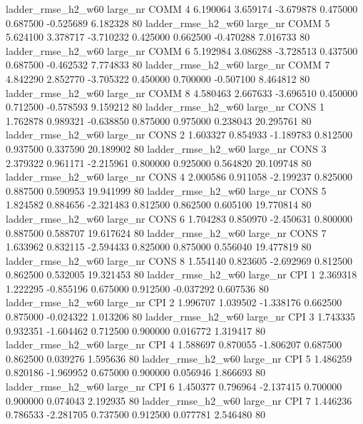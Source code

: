  ladder_rmse_h2_w60   large_nr     COMM                 4  6.190064  3.659174  -3.679878 0.475000 0.687500 -0.525689    6.182328 80
 ladder_rmse_h2_w60   large_nr     COMM                 5  5.624100  3.378717  -3.710232 0.425000 0.662500 -0.470288    7.016733 80
 ladder_rmse_h2_w60   large_nr     COMM                 6  5.192984  3.086288  -3.728513 0.437500 0.687500 -0.462532    7.774833 80
 ladder_rmse_h2_w60   large_nr     COMM                 7  4.842290  2.852770  -3.705322 0.450000 0.700000 -0.507100    8.464812 80
 ladder_rmse_h2_w60   large_nr     COMM                 8  4.580463  2.667633  -3.696510 0.450000 0.712500 -0.578593    9.159212 80
 ladder_rmse_h2_w60   large_nr     CONS                 1  1.762878  0.989321  -0.638850 0.875000 0.975000  0.238043   20.295761 80
 ladder_rmse_h2_w60   large_nr     CONS                 2  1.603327  0.854933  -1.189783 0.812500 0.937500  0.337590   20.189902 80
 ladder_rmse_h2_w60   large_nr     CONS                 3  2.379322  0.961171  -2.215961 0.800000 0.925000  0.564820   20.109748 80
 ladder_rmse_h2_w60   large_nr     CONS                 4  2.000586  0.911058  -2.199237 0.825000 0.887500  0.590953   19.941999 80
 ladder_rmse_h2_w60   large_nr     CONS                 5  1.824582  0.884656  -2.321483 0.812500 0.862500  0.605100   19.770814 80
 ladder_rmse_h2_w60   large_nr     CONS                 6  1.704283  0.850970  -2.450631 0.800000 0.887500  0.588707   19.617624 80
 ladder_rmse_h2_w60   large_nr     CONS                 7  1.633962  0.832115  -2.594433 0.825000 0.875000  0.556040   19.477819 80
 ladder_rmse_h2_w60   large_nr     CONS                 8  1.554140  0.823605  -2.692969 0.812500 0.862500  0.532005   19.321453 80
 ladder_rmse_h2_w60   large_nr      CPI                 1  2.369318  1.222295  -0.855196 0.675000 0.912500 -0.037292    0.607536 80
 ladder_rmse_h2_w60   large_nr      CPI                 2  1.996707  1.039502  -1.338176 0.662500 0.875000 -0.024322    1.013206 80
 ladder_rmse_h2_w60   large_nr      CPI                 3  1.743335  0.932351  -1.604462 0.712500 0.900000  0.016772    1.319417 80
 ladder_rmse_h2_w60   large_nr      CPI                 4  1.588697  0.870055  -1.806207 0.687500 0.862500  0.039276    1.595636 80
 ladder_rmse_h2_w60   large_nr      CPI                 5  1.486259  0.820186  -1.969952 0.675000 0.900000  0.056946    1.866693 80
 ladder_rmse_h2_w60   large_nr      CPI                 6  1.450377  0.796964  -2.137415 0.700000 0.900000  0.074043    2.192935 80
 ladder_rmse_h2_w60   large_nr      CPI                 7  1.446236  0.786533  -2.281705 0.737500 0.912500  0.077781    2.546480 80
